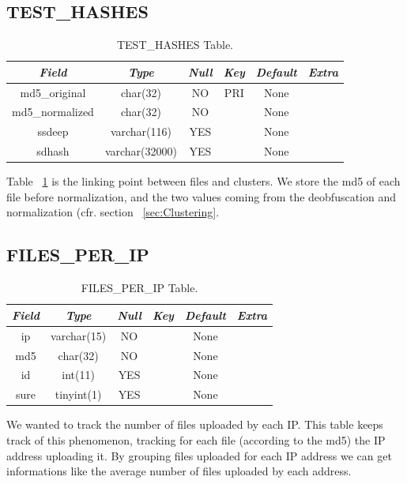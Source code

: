 \subsection{TEST\_HASHES}
\begin{table}[H]
\begin{center}
\begin{tabular}{|c|c|c|c|c|c|}
\hline
 \textit{Field} & \textit{Type} & \textit{Null} & \textit{Key} &
 \textit{Default} & \textit{Extra} \\
\hline
md5\_original & char(32) & NO & PRI & None &  \\
md5\_normalized & char(32) & NO &  & None &  \\
ssdeep & varchar(116) & YES &  & None &  \\
sdhash & varchar(32000) & YES &  & None &  \\
\hline
\end{tabular}
\caption{TEST\_HASHES Table.\label{tab:TEST_HASHESCategories}}
\end{center}
\end{table}

Table ~\ref{tab:TEST_HASHESCategories} is the linking point between files and clusters. We store the md5 of each file before normalization, and the two values coming from the deobfuscation and normalization (cfr. section ~\ref{sec:Clustering}.

\subsection{FILES\_PER\_IP}
\begin{table}[H]
\begin{center}
\begin{tabular}{|c|c|c|c|c|c|}
\hline
 \textit{Field} & \textit{Type} & \textit{Null} & \textit{Key} &
 \textit{Default} & \textit{Extra} \\
\hline
ip & varchar(15) & NO &  & None &  \\
md5 & char(32) & NO &  & None &  \\
id & int(11) & YES &  & None &  \\
sure & tinyint(1) & YES &  & None &  \\
\hline
\end{tabular}
\caption{FILES\_PER\_IP Table.\label{tab:FILES_PER_IPCategories}}
\end{center}
\end{table}

We wanted to track the number of files uploaded by each IP. This table keeps track of this phenomenon, tracking for each file (according to the md5) the IP address uploading it. By grouping files uploaded for each IP address we can get informations like the average number of files uploaded by each address.

